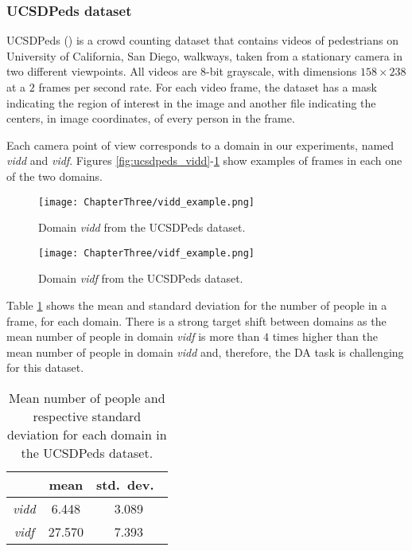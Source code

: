 \subsubsection{UCSDPeds dataset}
\label{sec:da_sensors_ucsdpeds}

UCSDPeds (\citet{Chan2008}) is a crowd counting dataset that contains videos of pedestrians on University of California, San Diego, walkways, taken from a stationary camera in two different viewpoints. All videos are 8-bit grayscale, with dimensions $158 \times 238$ at a $2$ frames per second rate. For each video frame, the dataset has a mask indicating the region of interest in the image and another file indicating the centers, in image coordinates, of every person in the frame.

Each camera point of view corresponds to a domain in our experiments, named \textit{vidd} and \textit{vidf}. Figures \ref{fig:ucsdpeds_vidd}-\ref{fig:ucsdpeds_vidf} show examples of frames in each one of the two domains.

\begin{figure}[!ht]
	\centering
	\begin{minipage}[b]{0.4\textwidth}
		\texttt{[image: ChapterThree/vidd\_example.png]}
		\caption{Domain \textit{vidd} from the UCSDPeds dataset.}
		\label{fig:ucsdpeds_vidd}
	\end{minipage}
	\hfill
	\begin{minipage}[b]{0.4\textwidth}
		\texttt{[image: ChapterThree/vidf\_example.png]}
		\caption{Domain \textit{vidf} from the UCSDPeds dataset.}
		\label{fig:ucsdpeds_vidf}
	\end{minipage}
\end{figure}

Table \ref{tab:ucsdpeds_domains} shows the mean and standard deviation for the number of people in a frame, for each domain. There is a strong target shift between domains as the mean number of people in domain \textit{vidf} is more than $4$ times higher than the mean number of people in domain \textit{vidd} and, therefore, the DA task is challenging for this dataset.

\begin{table}[!ht]
	\centering
	\begin{tabular}{c| c c}
		 & mean & std.\ dev.\  \\
		\hline
		\textit{vidd} & 6.448 & 3.089\\
		\textit{vidf} & 27.570 & 7.393 \\
	\end{tabular}
	\caption{Mean number of people and respective standard deviation for each domain in the UCSDPeds dataset.}
	\label{tab:ucsdpeds_domains}
\end{table}

